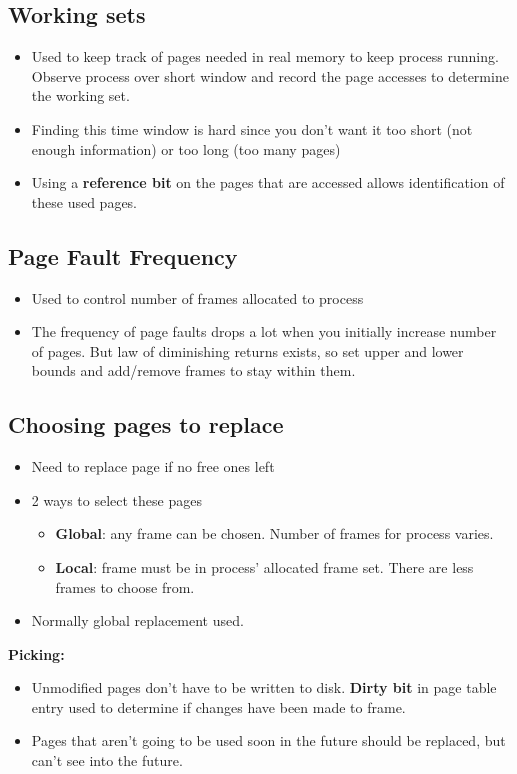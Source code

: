 \documentclass{article}
\begin{document}
	\subsection{Working sets}
		\begin{itemize}
			\item Used to keep track of pages needed in real memory to keep process running. Observe process over short window and record the page accesses to determine the working set.
			\item Finding this time window is hard since you don't want it too short (not enough information) or too long (too many pages)
			\item Using a \textbf{reference bit} on the pages that are accessed allows identification of these used pages.
		\end{itemize}
		
	\subsection{Page Fault Frequency}
		\begin{itemize}
			\item Used to control number of frames allocated to process
			\item The frequency of page faults drops a lot when you initially increase number of pages. But law of diminishing returns exists, so set upper and lower bounds and add/remove frames to stay within them.
		\end{itemize}
		
	\subsection{Choosing pages to replace}
		\begin{itemize}
			\item Need to replace page if no free ones left
			\item 2 ways to select these pages
				\begin{itemize}
					\item \textbf{Global}: any frame can be chosen. Number of frames for process varies.
					\item \textbf{Local}: frame must be in process' allocated frame set. There are less frames to choose from.
				\end{itemize}
			\item Normally global replacement used.
		\end{itemize}
		
		\textbf{Picking:}
		\begin{itemize}
			\item Unmodified pages don't have to be written to disk. \textbf{Dirty bit} in page table entry used to determine if changes have been made to frame.
			\item Pages that aren't going to be used soon in the future should be replaced, but can't see into the future.
		\end{itemize}
		
\end{document}
